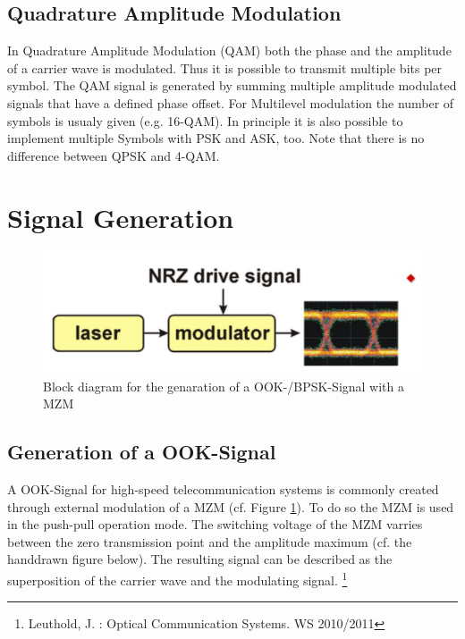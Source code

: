 \subsection{Quadrature Amplitude Modulation}
In Quadrature Amplitude Modulation (QAM) both the phase and the amplitude of a carrier wave is modulated. Thus it is possible to transmit multiple bits per symbol. The QAM signal is generated by summing multiple amplitude modulated signals that have a defined phase offset. For Multilevel modulation the number of symbols is usualy given (e.g. 16-QAM). In principle it is also possible to implement multiple Symbols with PSK and ASK, too. Note that there is no difference between QPSK and 4-QAM.\footnotemark[1]
\newpage
\section{Signal Generation}
\begin{figure}
  \centering
  \includegraphics[width=.5\columnwidth]{Grafiken/Signal-generation.jpg}

\caption{Block diagram for the genaration of a OOK-/BPSK-Signal with a MZM }
\label{fig:signal}
\end{figure}

\subsection{Generation of a OOK-Signal}
A OOK-Signal for high-speed telecommunication systems is commonly created through external modulation of a MZM (cf. Figure \ref{fig:signal}). To do so the MZM is used in the push-pull operation mode. The switching voltage of the MZM varries between the zero transmission point and the amplitude maximum (cf. the handdrawn figure below). The resulting signal can be described as the superposition of the carrier wave and the modulating signal. \footnote[1]{Leuthold, J. : Optical Communication Systems. WS 2010/2011}

